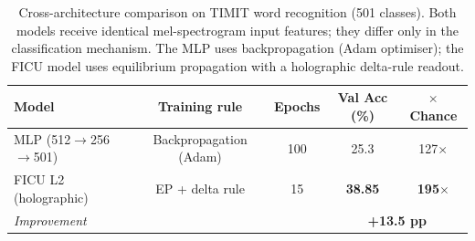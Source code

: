 \begin{table}[ht]
\centering
\caption{Cross-architecture comparison on TIMIT word recognition (501 classes).
Both models receive identical mel-spectrogram input features; they differ only
in the classification mechanism. The MLP uses backpropagation (Adam optimiser);
the FICU model uses equilibrium propagation with a holographic delta-rule readout.}
\label{tab:cross_architecture}
\begin{tabular}{lcccc}
\toprule
\textbf{Model} & \textbf{Training rule} & \textbf{Epochs} & \textbf{Val Acc (\%)} & \textbf{$\times$ Chance} \\
\midrule
MLP (512$\to$256$\to$501) & Backpropagation (Adam) & 100 & 25.3 & 127$\times$ \\
FICU L2 (holographic)     & EP + delta rule        & 15  & \textbf{38.85} & \textbf{195$\times$} \\
\midrule
\multicolumn{3}{l}{\textit{Improvement}} & \multicolumn{2}{c}{\textbf{+13.5 pp}} \\
\bottomrule
\end{tabular}
\end{table}
